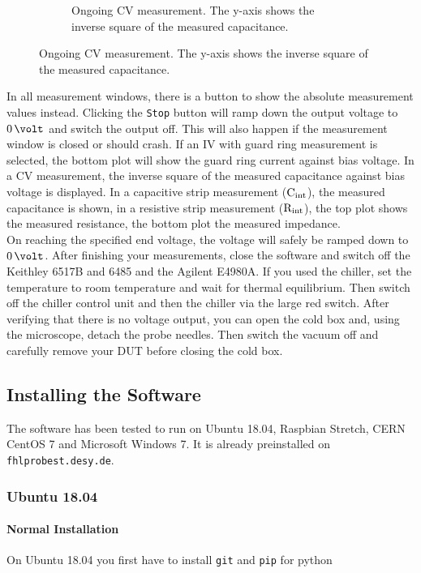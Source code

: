 \documentclass[a4paper]{article}
\begin{document}
\begin{figure}[hbtp]
\begin{subfigure}[t]{0.475\textwidth}
\caption[Running CV Measurement]{Ongoing CV measurement. The y-axis shows the inverse square of the measured capacitance.}
\label{fig:cvmeas}
\end{subfigure}
\end{figure}

In all measurement windows, there is a button to show the absolute measurement values instead.
Clicking the {\tt Stop} button will ramp down the output voltage to $0\,\volt$ and switch the output off.
This will also happen if the measurement window is closed or should crash.
If an IV with guard ring measurement is selected, the bottom plot will show the guard ring current against bias voltage.
In a CV measurement, the inverse square of the measured capacitance against bias voltage is displayed.
In a capacitive strip measurement (${\rm C_{int}}$), the measured capacitance is shown, in a resistive strip measurement (${\rm R_{int}}$), the top plot shows the measured resistance, the bottom plot the measured impedance.\\

On reaching the specified end voltage, the voltage will safely be ramped down to $0\,\volt$.
After finishing your measurements, close the software and switch off the Keithley 6517B and 6485 and the Agilent E4980A.
If you used the chiller, set the temperature to room temperature and wait for thermal equilibrium.
Then switch off the chiller control unit and then the chiller via the large red switch.
After verifying that there is no voltage output, you can open the cold box and, using the microscope, detach the probe needles.
Then switch the vacuum off and carefully remove your DUT before closing the cold box.\\

\subsection{Installing the Software}
\label{sec:installation}

The software has been tested to run on Ubuntu 18.04, Raspbian Stretch, CERN CentOS 7 and Microsoft Windows 7.
It is already preinstalled on {\tt fhlprobest.desy.de}.

\subsubsection{Ubuntu 18.04}

\paragraph{Normal Installation\\}
On Ubuntu 18.04 you first have to install {\tt git} and {\tt pip} for python
\end{document}
